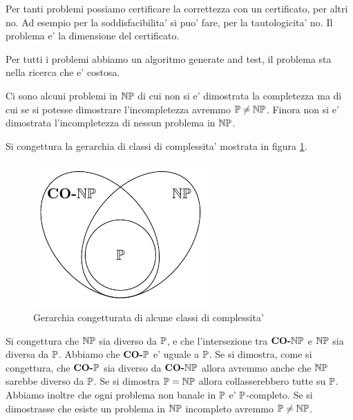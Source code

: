 Per tanti problemi possiamo certificare la correttezza con un certificato, per altri no. Ad esempio
per la soddisfacibilita' si puo' fare, per la tautologicita' no. Il problema e' la dimensione del
certificato.

Per tutti i problemi abbiamo un algoritmo generate and test, il problema sta nella ricerca che e'
costosa.


Ci sono alcuni problemi in $\mathbb{NP}$ di cui non si e' dimostrata la completezza ma di cui se si potesse
dimostrare l'incompletezza avremmo $\mathbb{P} \not= \mathbb{NP}$. Finora non si e' dimostrata l'incompletezza di
nessun problema in $\mathbb{NP}$.


Si congettura la gerarchia di classi di complessita' mostrata in figura \ref{ConjecturedHierarchy}.

\begin{figure}[h]
    \begin{center}
        \includegraphics{img/NPCONP.pdf}
    \end{center}
    \caption{Gerarchia congetturata di alcune classi di complessita'}
    \label{ConjecturedHierarchy}
\end{figure}

Si congettura che $\mathbb{NP}$ sia diverso da $\mathbb{P}$, e che l'intersezione tra $\textbf{CO-}\mathbb{NP}$ e
$\mathbb{NP}$ sia diversa da $\mathbb{P}$. Abbiamo che $\textbf{CO-}\mathbb{P}$ e' uguale a $\mathbb{P}$. Se si dimostra,
come si congettura, che $\textbf{CO-}\mathbb{P}$ sia diverso da $\textbf{CO-}\mathbb{NP}$ allora avremmo anche che $\mathbb{NP}$
sarebbe diverso da $\mathbb{P}$. Se si dimostra $\mathbb{P} = \mathbb{NP}$ allora
collasserebbero tutte su $\mathbb{P}$. Abbiamo inoltre che ogni problema non banale in $\mathbb{P}$ e'
$\mathbb{P}$-completo. Se si dimostrasse che esiste un problema in $\mathbb{NP}$ incompleto avremmo
$\mathbb{P} \not= \mathbb{NP}$.

